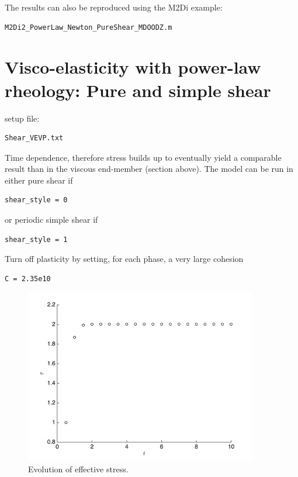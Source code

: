 \documentclass[12pt,english,openany]{scrbook}
\begin{document}
The results can also be reproduced using the M2Di example:
\begin{verbatim} 
M2Di2_PowerLaw_Newton_PureShear_MDOODZ.m
\end{verbatim}

\section{Visco-elasticity with power-law rheology: Pure and simple shear}

setup file:
\begin{verbatim} 
Shear_VEVP.txt
\end{verbatim}

Time dependence, therefore stress builds up to eventually yield a comparable result than in the viscous end-member (section above).
The model can be run in either pure shear if 
\begin{verbatim} 
shear_style = 0
\end{verbatim}

or periodic simple shear if 
\begin{verbatim} 
shear_style = 1
\end{verbatim}

Turn off plasticity by setting, for each phase, a very large cohesion
\begin{verbatim} 
C = 2.35e10
\end{verbatim}

\begin{figure}[ht!]
\centerline{\includegraphics[height=3.0in]{./Figures/PureShear_pwl_VE_evol}}
\caption{Evolution of effective stress.}
\label{PureShear_pwl_VE_evol}
\end{figure}
\end{document}
